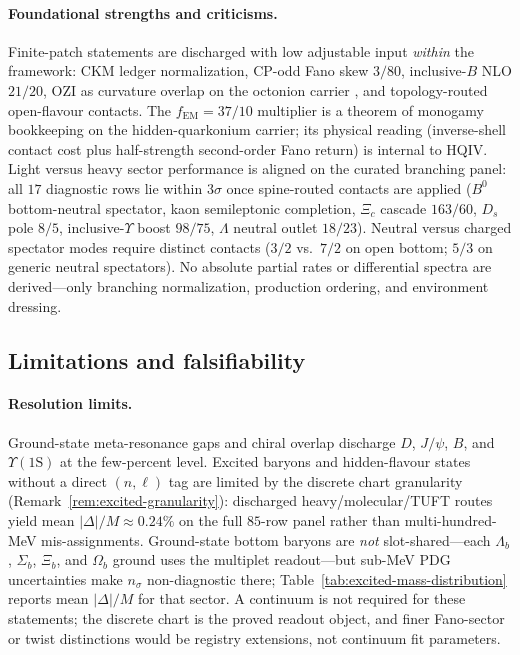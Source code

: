 \documentclass[11pt]{amsart}
\begin{document}
\paragraph{Foundational strengths and criticisms.}
Finite-patch statements are discharged with low adjustable input \emph{within} the
framework: CKM ledger normalization, CP-odd Fano skew $3/80$, inclusive-$B$ NLO
$21/20$, OZI as curvature overlap on the octonion carrier
\cite{hqiv-gluon-curvature-note}, and topology-routed open-flavour contacts.
The $f_{\mathrm{EM}}=37/10$ multiplier is a theorem of monogamy
bookkeeping on the hidden-quarkonium carrier; its physical reading (inverse-shell
contact cost plus half-strength second-order Fano return) is internal to HQIV.
Light versus heavy sector performance is aligned on the curated branching panel:
all $17$ diagnostic rows lie within $3\sigma$ once spine-routed contacts are applied
($B^0$ bottom-neutral spectator, kaon semileptonic completion, $\Xi_c$ cascade
$163/60$, $D_s$ pole $8/5$, inclusive-$\Upsilon$ boost $98/75$, $\Lambda$ neutral
outlet $18/23$).
Neutral versus charged spectator modes require distinct contacts ($3/2$ vs.\ $7/2$
on open bottom; $5/3$ on generic neutral spectators).
No absolute partial rates or differential spectra are derived---only branching
normalization, production ordering, and environment dressing.

\subsection{Limitations and falsifiability}
\label{sec:limitations}

\paragraph{Resolution limits.}
Ground-state meta-resonance gaps and chiral overlap discharge $D$, $J/\psi$,
$B$, and $\Upsilon(1\mathrm{S})$ at the few-percent level.
Excited baryons and hidden-flavour states without a direct $(n,\ell)$ tag are limited
by the discrete chart granularity (Remark~\ref{rem:excited-granularity}): discharged
heavy/molecular/TUFT routes yield mean $|\Delta|/M \approx 0.24\%$ on the full
$85$-row panel rather than multi-hundred-MeV mis-assignments.
Ground-state bottom baryons are \emph{not} slot-shared---each $\Lambda_b$, $\Sigma_b$,
$\Xi_b$, and $\Omega_b$ ground uses the multiplet readout---but sub-MeV PDG
uncertainties make $n_\sigma$ non-diagnostic there; Table~\ref{tab:excited-mass-distribution}
reports mean $|\Delta|/M$ for that sector.
A continuum is not required for these statements; the discrete chart is the
proved readout object, and finer Fano-sector or twist distinctions would be
registry extensions, not continuum fit parameters.
\end{document}

